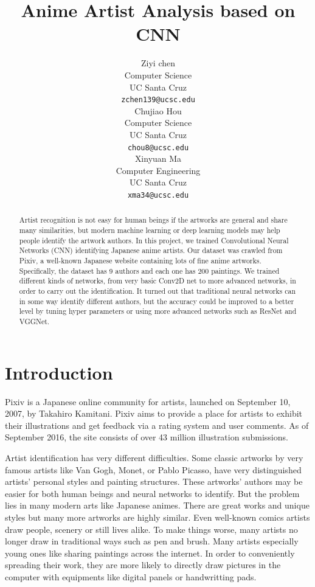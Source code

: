 \documentclass{article}
\title{Anime Artist Analysis based on CNN}
\author{Ziyi chen \\
  Computer Science  \\
  UC Santa Cruz\\
  {\tt zchen139@ucsc.edu} \\\And
   Chujiao Hou\\
  Computer Science  \\
  UC Santa Cruz\\
  {\tt chou8@ucsc.edu} \\\And
   Xinyuan Ma\\
  Computer Engineering  \\
  UC Santa Cruz\\
  {\tt xma34@ucsc.edu} \\}
\begin{document}

\maketitle

\begin{abstract}
Artist recognition is not easy for human beings if the artworks are general and share many similarities, but modern machine learning or deep learning models may help people identify the artwork authors. In this project, we trained Convolutional Neural Networks (CNN) identifying Japanese anime artists. Our dataset was crawled from Pixiv, a well-known Japanese website containing lots of fine anime artworks. Specifically, the dataset has 9 authors and each one has 200 paintings. We trained different kinds of networks, from very basic Conv2D net to more advanced networks, in order to carry out the identification. It turned out that traditional neural networks can in some way identify different authors, but the accuracy could be improved to a better level by tuning hyper parameters or using more advanced networks such as ResNet and VGGNet.

\end{abstract}

\section{Introduction}
Pixiv is a Japanese online community for artists, launched on September 10, 2007, by Takahiro Kamitani. Pixiv aims to provide a place for artists to exhibit their illustrations and get feedback via a rating system and user comments. As of September 2016, the site consists of over 43 million illustration submissions.

Artist identification has very different difficulties. Some classic artworks by very famous artists like Van Gogh, Monet, or Pablo Picasso, have very distinguished artists’ personal styles and painting structures. These artworks’ authors may be easier for both human beings and neural networks to identify. But the problem lies in many modern arts like Japanese animes. There are great works and unique styles but many more artworks are highly similar. Even well-known comics artists draw people, scenery or still lives alike. To make things worse, many artists no longer draw in traditional ways such as pen and brush. Many artists especially young ones like sharing paintings across the internet. In order to conveniently spreading their work, they are more likely to directly draw pictures in the computer with equipments like digital panels or handwritting pads.
\end{document}
